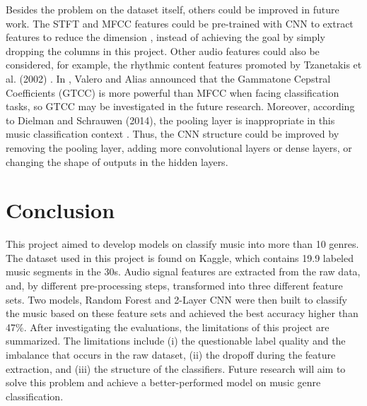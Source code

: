 \documentclass[sigconf ,nonacm]{acmart}
\begin{document}
Besides the problem on the dataset itself, others could be improved in future work. The STFT and MFCC features could be pre-trained with CNN to extract features to reduce the dimension \cite{fu2010survey,dieleman2011audio}, instead of achieving the goal by simply dropping the columns in this project. Other audio features could also be considered, for example, the rhythmic content features promoted by Tzanetakis et al. (2002) \cite{gtzan}. In \cite{valero2012gammatone}, Valero and Alias announced that the Gammatone Cepstral Coefficients (GTCC) is more powerful than MFCC when facing classification tasks, so GTCC may be investigated in the future research. Moreover, according to Dielman and Schrauwen (2014), the pooling layer is inappropriate in this music classification context \cite{endtoend}. Thus, the CNN structure could be improved by removing the pooling layer, adding more convolutional layers or dense layers, or changing the shape of outputs in the hidden layers. 


\section{Conclusion}

This project aimed to develop models on classify music into more than 10 genres. The dataset used in this project is found on Kaggle, which contains 19.9 labeled music segments in the 30s. Audio signal features are extracted from the raw data, and, by different pre-processing steps, transformed into three different feature sets. Two models, Random Forest and 2-Layer CNN were then built to classify the music based on these feature sets and achieved the best accuracy higher than 47\%. After investigating the evaluations, the limitations of this project are summarized. The limitations include (i) the questionable label quality and the imbalance that occurs in the raw dataset, (ii) the dropoff during the feature extraction, and (iii) the structure of the classifiers. Future research will aim to solve this problem and achieve a better-performed model on music genre classification.
    



{}
\end{document}
